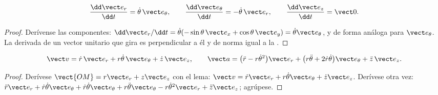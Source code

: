 \begin{lemma}\label{lem:b1:point-kinematics:basisderiv}
\[
\frac{\dd\vect e_r}{\dd t} = \dot\theta\,\vect e_\theta, \qquad
\frac{\dd\vect e_\theta}{\dd t} = -\dot\theta\,\vect e_r, \qquad
\frac{\dd\vect e_z}{\dd t} = \vect 0 .
\]
\end{lemma}

\begin{proof}
Derívense las componentes: $\dd\vect e_r/\dd t = \dot\theta(-\sin\theta\,
\vect e_x + \cos\theta\,\vect e_y) = \dot\theta\vect e_\theta$, y de forma
análoga para $\vect e_\theta$. La derivada de un vector unitario que gira
es perpendicular a él y de norma igual a la .
\end{proof}

\begin{theorem}\label{thm:b1:point-kinematics:cylindrical}
\[
\vect v = \dot r\,\vect e_r + r\dot\theta\,\vect e_\theta + \dot z\,\vect e_z,
\qquad
\vect a = \big(\ddot r - r\dot\theta^2\big)\vect e_r
+ \big(r\ddot\theta + 2\dot r\dot\theta\big)\vect e_\theta + \ddot z\,\vect e_z .
\]
\end{theorem}

\begin{proof}
Derívese $\vect{OM} = r\vect e_r + z\vect e_z$ con el lema:
$\vect v = \dot r\vect e_r + r\dot\theta\vect e_\theta + \dot z\vect e_z$.
Derívese otra vez: $\ddot r\vect e_r + \dot r\dot\theta\vect e_\theta +
\dot r\dot\theta\vect e_\theta + r\ddot\theta\vect e_\theta - r\dot\theta^2
\vect e_r + \ddot z\vect e_z$; agrúpese.
\end{proof}

